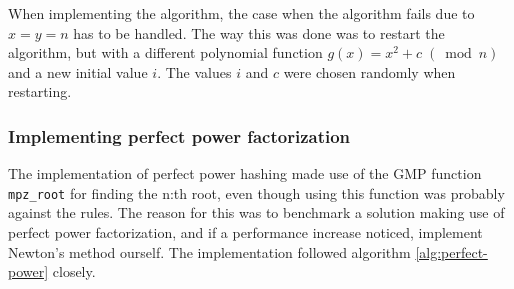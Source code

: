 When implementing the algorithm, the case
when the algorithm fails due to $x = y = n$  has to be handled. 
The way this was done was to restart the algorithm,
but with a different polynomial function $g(x) = x^2 + c \; (\bmod n)$ and a 
new initial value $i$. The values $i$ and $c$ were chosen randomly when
restarting.

\subsubsection{Implementing perfect power factorization}
The implementation of perfect power hashing made use of the GMP function
\texttt{mpz\_root} for finding the n:th root, even though using this 
function was probably against the
rules. The reason for this was to benchmark a solution making use of perfect
power factorization, and if a performance increase noticed, 
implement Newton's method
ourself. The implementation followed algorithm \ref{alg:perfect-power} closely.
